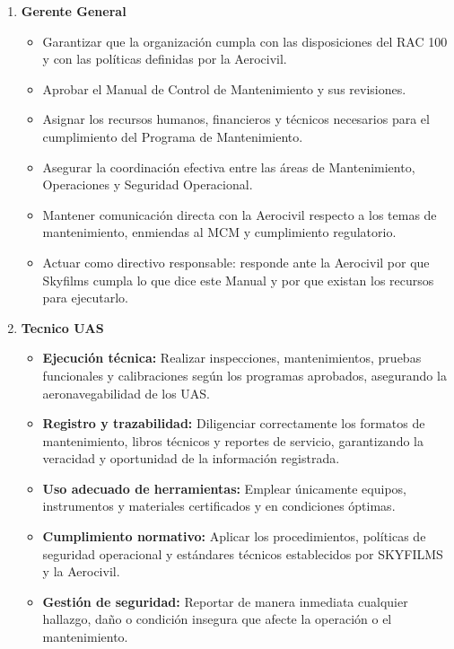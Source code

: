 \begin{enumerate}
    \item \textbf{Gerente General}
        \begin{itemize}
            \item Garantizar que la organización cumpla con las disposiciones del RAC 100 y con las políticas definidas por la Aerocivil.
            \item Aprobar el Manual de Control de Mantenimiento y sus revisiones.
            \item Asignar los recursos humanos, financieros y técnicos necesarios para el cumplimiento del Programa de Mantenimiento.
            \item Asegurar la coordinación efectiva entre las áreas de Mantenimiento, Operaciones y Seguridad Operacional.
            \item Mantener comunicación directa con la Aerocivil respecto a los temas de mantenimiento, enmiendas al MCM y cumplimiento regulatorio.
            \item Actuar como directivo responsable: responde ante la Aerocivil por que Skyfilms cumpla lo que dice este Manual y por que existan los recursos para ejecutarlo.
        \end{itemize}
    \item \textbf{Tecnico UAS}
        \begin{itemize}
            \item \textbf{Ejecución técnica:} Realizar inspecciones, mantenimientos, pruebas funcionales y calibraciones según los programas aprobados, asegurando la aeronavegabilidad de los UAS.

            \item \textbf{Registro y trazabilidad:} Diligenciar correctamente los formatos de mantenimiento, libros técnicos y reportes de servicio, garantizando la veracidad y oportunidad de la información registrada.

            \item \textbf{Uso adecuado de herramientas:} Emplear únicamente equipos, instrumentos y materiales certificados y en condiciones óptimas.

            \item \textbf{Cumplimiento normativo:} Aplicar los procedimientos, políticas de seguridad operacional y estándares técnicos establecidos por SKYFILMS y la Aerocivil.

            \item \textbf{Gestión de seguridad:} Reportar de manera inmediata cualquier hallazgo, daño o condición insegura que afecte la operación o el mantenimiento.


\end{itemize}
\end{enumerate}
